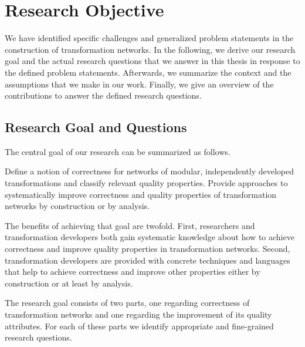 \section{Research Objective}

We have identified specific challenges and generalized problem statements in the construction of transformation networks.
In the following, we derive our research goal and the actual research questions that we answer in this thesis in response to the defined problem statements.
Afterwards, we summarize the context and the assumptions that we make in our work.
Finally, we give an overview of the contributions to answer the defined research questions.

\subsection{Research Goal and Questions}

The central goal of our research can be summarized as follows.
\begin{researchgoal}
Define a notion of correctness for networks of modular, independently developed transformations and classify relevant quality properties.
Provide approaches to systematically improve correctness and quality properties of transformation networks by construction or by analysis.
\end{researchgoal}

The benefits of achieving that goal are twofold.
First, researchers and transformation developers both gain systematic knowledge about how to achieve correctness and improve quality properties in transformation networks.
Second, transformation developers are provided with concrete techniques and languages that help to achieve correctness and improve other properties either by construction or at least by analysis.

The research goal consists of two parts, one regarding correctness of transformation networks and one regarding the improvement of its quality attributes.
For each of these parts we identify appropriate and fine-grained research questions.



